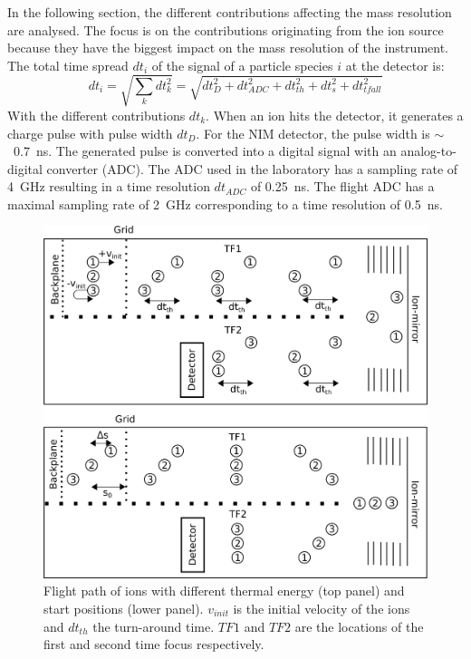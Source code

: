	In the following section, the different contributions affecting the mass resolution are analysed. The focus is on the contributions originating from the ion source because they have the biggest impact on the mass resolution of the instrument.\\
	The total time spread $dt_i$ of the signal of a particle species $i$ at the detector is:
	\begin{equation}
		dt_i = \sqrt{\sum_{k} dt_k^2} = \sqrt{dt_D^2 + dt_{ADC}^2 + dt_{th}^2 + dt_{s}^2 + dt_{tfall}^2} 
	\end{equation}
	With the different contributions $dt_k$. When an ion hits the detector, it generates a charge pulse with pulse width $dt_D$. For the NIM detector, the pulse width is $\sim$~0.7~ns. The generated pulse is converted into a digital signal with an analog-to-digital converter (ADC). The ADC used in the laboratory has a sampling rate of 4~GHz resulting in a time resolution $dt_{ADC}$ of 0.25~ns. The flight ADC has a maximal sampling rate of 2~GHz corresponding to a time resolution of 0.5~ns.\\
	\begin{figure}[h] %
		\centering
		\includegraphics[width= .9\textwidth]{Bilder/ISStartPosThermEn.png}
		\caption{Flight path of ions with different thermal energy (top panel) and start positions (lower panel). $v_{init}$ is the initial velocity of the ions and $dt_{th}$ the turn-around time. $TF1$ and $TF2$ are the locations of the first and second time focus respectively.}
		\label{fig:thISStartPosThermEn}
	\end{figure}

